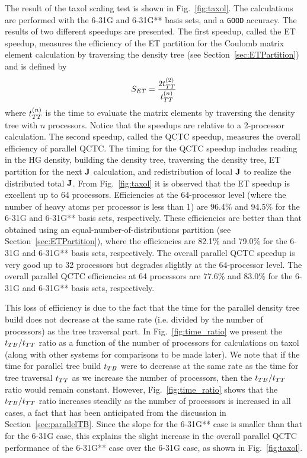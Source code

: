 \commentoutA{\documentclass[prl,aps,twocolumn,twocolumngrid,superbib]{revtex4}}
\begin{document}
The result of the taxol scaling test is shown in Fig.~\ref{fig:taxol}.
The calculations are performed with the 6-31G and 6-31G** basis sets,
and a {\tt GOOD} accuracy\cite{CTymczak04a}.  The results of two
different speedups are presented.  The first speedup, called the ET
speedup, measures the efficiency of the ET partition for the Coulomb
matrix element calculation by traversing the density tree (see
Section~\ref{sec:ETPartition}) and is defined by
\begin{equation}
S_{ET} = \frac{2t_{TT}^{(2)}}{t_{TT}^{(n)}}
\end{equation}
where $t_{TT}^{(n)}$ is the time to evaluate the matrix elements by
traversing the density tree with $n$ processors. Notice that the
speedups are relative to a 2-processor calculation.  The second
speedup, called the QCTC speedup, measures the overall efficiency of
parallel QCTC. 
The timing for the QCTC speedup includes
reading in the HG density, building the 
density tree, traversing the density tree, ET partition for the 
next ${\bf J}$ calculation, and redistribution\cite{CGan03} of local ${\bf J}$ to realize 
the distributed total ${\bf J}$.
From Fig.~\ref{fig:taxol} it is observed that the ET
speedup is excellent up to 64 processors. 
Efficiencies at the
64-processor level (where the number of heavy atoms per processor is
less than 1) are 96.4\% and 94.5\% for the 6-31G and 6-31G** basis sets,
respectively. These efficiencies are better than that obtained using 
an equal-number-of-distributions partition (see Section~\ref{sec:ETPartition}),
where the efficiencies are 82.1\% and 79.0\% for the 6-31G and 6-31G** basis
sets, respectively.
The overall parallel QCTC speedup is very good up to 32 processors but
degrades slightly at the 64-processor level.  The overall parallel
QCTC efficiencies at 64 processors are
77.6\% and 83.0\% for the 6-31G and 6-31G** basis sets, respectively.

This loss of efficiency is due to the fact that the time for the parallel
density tree build does not decrease at the same rate (i.e.  divided
by the number of processors) as the tree traversal part.  In
Fig.~\ref{fig:time_ratio} we present the $t_{TB}/t_{TT}$ ratio as a
function of the number of processors for calculations on taxol (along
with other systems for comparisons to be made later).  We note that if
the time for parallel tree build $t_{TB}$ were to decrease at the same
rate as the time for tree
traversal $t_{TT}$ as we increase the number of processors, then the
$t_{TB}/t_{TT}$ ratio would remain constant.  However,
Fig.~\ref{fig:time_ratio} shows that the $t_{TB}/t_{TT}$ ratio increases
steadily as the number of processors is increased in all cases, a fact
that has been anticipated from the discussion in
Section~\ref{sec:parallelTB}.  Since the slope for the 6-31G** case is
smaller than that for the 6-31G case, this explains the slight
increase in the overall parallel QCTC performance of the 6-31G** case
over the 6-31G case, as shown in Fig.~\ref{fig:taxol}.
\end{document}

